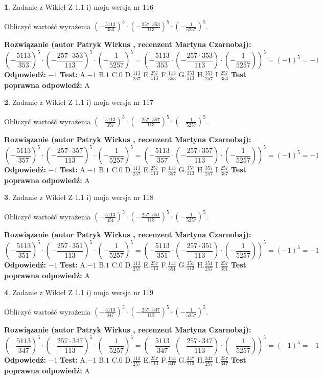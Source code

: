 \documentclass[12pt, a4paper]{article}
\theoremstyle{definition} %
\newtheorem{zad}{}
\newcommand{\zadStart}[1]{\begin{zad}#1\newline}
\newcommand{\zadStop}{\end{zad}}
\newcommand{\rozwStart}[2]{\noindent \textbf{Rozwiązanie (autor #1 , recenzent #2): }\newline}
\newcommand{\rozwStop}{\newline}
\newcommand{\odpStart}{\noindent \textbf{Odpowiedź:}\newline}
\newcommand{\odpStop}{\newline}
\newcommand{\testStart}{\noindent \textbf{Test:}\newline}
\newcommand{\testStop}{\newline}
\newcommand{\kluczStart}{\noindent \textbf{Test poprawna odpowiedź:}\newline}
\newcommand{\kluczStop}{\newline}
\begin{document}
\zadStart{Zadanie z Wikieł Z 1.1 i) moja wersja nr 116}

Obliczyć wartość wyrażenia $(-\frac{5113}{353})^{5} \cdot (-\frac{257 \cdot 353}{113})^{5} \cdot (-\frac{1}{5257})^{5}$.
\zadStop
\rozwStart{Patryk Wirkus}{Martyna Czarnobaj}
$$(-\frac{5113}{353})^{5} \cdot (-\frac{257 \cdot 353}{113})^{5} \cdot (-\frac{1}{5257})^{5} = (-\frac{5113}{353} \cdot (-\frac{257 \cdot 353}{113}) \cdot (-\frac{1}{5257}))^{5} = (-1)^{5} = -1$$
\rozwStop
\odpStart
$-1$
\odpStop
\testStart
A.$-1$ B.$1$ C.$0$ D.$\frac{113}{257}$ E.$\frac{257}{113}$
F.$\frac{113}{353}$ G.$\frac{353}{113}$
H.$\frac{353}{257}$
I.$\frac{257}{353}$
\testStop
\kluczStart
A
\kluczStop



\zadStart{Zadanie z Wikieł Z 1.1 i) moja wersja nr 117}

Obliczyć wartość wyrażenia $(-\frac{5113}{357})^{5} \cdot (-\frac{257 \cdot 357}{113})^{5} \cdot (-\frac{1}{5257})^{5}$.
\zadStop
\rozwStart{Patryk Wirkus}{Martyna Czarnobaj}
$$(-\frac{5113}{357})^{5} \cdot (-\frac{257 \cdot 357}{113})^{5} \cdot (-\frac{1}{5257})^{5} = (-\frac{5113}{357} \cdot (-\frac{257 \cdot 357}{113}) \cdot (-\frac{1}{5257}))^{5} = (-1)^{5} = -1$$
\rozwStop
\odpStart
$-1$
\odpStop
\testStart
A.$-1$ B.$1$ C.$0$ D.$\frac{113}{257}$ E.$\frac{257}{113}$
F.$\frac{113}{357}$ G.$\frac{357}{113}$
H.$\frac{357}{257}$
I.$\frac{257}{357}$
\testStop
\kluczStart
A
\kluczStop



\zadStart{Zadanie z Wikieł Z 1.1 i) moja wersja nr 118}

Obliczyć wartość wyrażenia $(-\frac{5113}{351})^{5} \cdot (-\frac{257 \cdot 351}{113})^{5} \cdot (-\frac{1}{5257})^{5}$.
\zadStop
\rozwStart{Patryk Wirkus}{Martyna Czarnobaj}
$$(-\frac{5113}{351})^{5} \cdot (-\frac{257 \cdot 351}{113})^{5} \cdot (-\frac{1}{5257})^{5} = (-\frac{5113}{351} \cdot (-\frac{257 \cdot 351}{113}) \cdot (-\frac{1}{5257}))^{5} = (-1)^{5} = -1$$
\rozwStop
\odpStart
$-1$
\odpStop
\testStart
A.$-1$ B.$1$ C.$0$ D.$\frac{113}{257}$ E.$\frac{257}{113}$
F.$\frac{113}{351}$ G.$\frac{351}{113}$
H.$\frac{351}{257}$
I.$\frac{257}{351}$
\testStop
\kluczStart
A
\kluczStop



\zadStart{Zadanie z Wikieł Z 1.1 i) moja wersja nr 119}

Obliczyć wartość wyrażenia $(-\frac{5113}{347})^{5} \cdot (-\frac{257 \cdot 347}{113})^{5} \cdot (-\frac{1}{5257})^{5}$.
\zadStop
\rozwStart{Patryk Wirkus}{Martyna Czarnobaj}
$$(-\frac{5113}{347})^{5} \cdot (-\frac{257 \cdot 347}{113})^{5} \cdot (-\frac{1}{5257})^{5} = (-\frac{5113}{347} \cdot (-\frac{257 \cdot 347}{113}) \cdot (-\frac{1}{5257}))^{5} = (-1)^{5} = -1$$
\rozwStop
\odpStart
$-1$
\odpStop
\testStart
A.$-1$ B.$1$ C.$0$ D.$\frac{113}{257}$ E.$\frac{257}{113}$
F.$\frac{113}{347}$ G.$\frac{347}{113}$
H.$\frac{347}{257}$
I.$\frac{257}{347}$
\testStop
\kluczStart
A
\kluczStop
\end{document}
